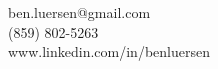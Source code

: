 \documentclass[margin,line]{resume}
\begin{document}
{
    \hfill ben.luersen@gmail.com       \vspace{0mm}\\\vspace{0mm}%
    \hfill (859) 802-5263 \vspace{0mm}\\\vspace{0mm}%
    \hfill www.linkedin.com/in/benluersen           \vspace{-9mm}\\\vspace{0mm}%
    
}
\end{document}
